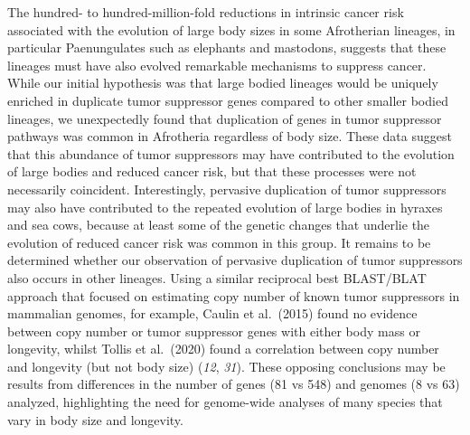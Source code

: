 \documentclass[]{elsarticle} %
\begin{document}
The hundred- to hundred-million-fold reductions in intrinsic cancer risk associated with the evolution of large body sizes in some Afrotherian lineages, in particular Paenungulates such as elephants and mastodons, suggests that these lineages must have also evolved remarkable mechanisms to suppress cancer. While our initial hypothesis was that large bodied lineages would be uniquely enriched in duplicate tumor suppressor genes compared to other smaller bodied lineages, we unexpectedly found that duplication of genes in tumor suppressor pathways was common in Afrotheria regardless of body size. These data suggest that this abundance of tumor suppressors may have contributed to the evolution of large bodies and reduced cancer risk, but that these processes were not necessarily coincident. Interestingly, pervasive duplication of tumor suppressors may also have contributed to the repeated evolution of large bodies in hyraxes and sea cows, because at least some of the genetic changes that underlie the evolution of reduced cancer risk was common in this group. It remains to be determined whether our observation of pervasive duplication of tumor suppressors also occurs in other lineages. Using a similar reciprocal best BLAST/BLAT approach that focused on estimating copy number of known tumor suppressors in mammalian genomes, for example, Caulin et al.~(2015) found no evidence between copy number or tumor suppressor genes with either body mass or longevity, whilst Tollis et al.~(2020) found a correlation between copy number and longevity (but not body size) (\emph{12}, \emph{31}). These opposing conclusions may be results from differences in the number of genes (81 vs 548) and genomes (8 vs 63) analyzed, highlighting the need for genome-wide analyses of many species that vary in body size and longevity.
\end{document}

